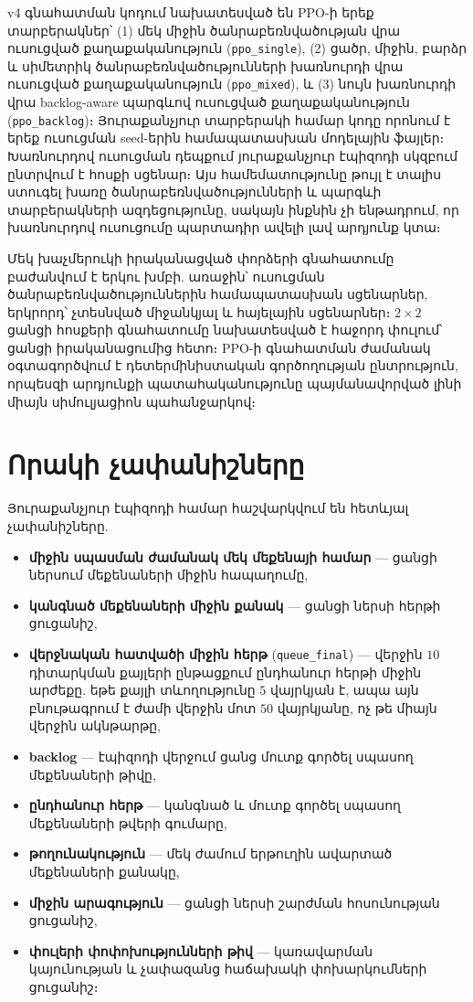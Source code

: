 \documentclass[12pt,a4paper]{extreport}
\begin{document}
v4 գնահատման կոդում նախատեսված են PPO-ի երեք տարբերակներ՝ (1) մեկ միջին ծանրաբեռնվածության վրա ուսուցված քաղաքականություն (\texttt{ppo\_single}), (2) ցածր, միջին, բարձր և սիմետրիկ ծանրաբեռնվածությունների խառնուրդի վրա ուսուցված քաղաքականություն (\texttt{ppo\_mixed}), և (3) նույն խառնուրդի վրա backlog-aware պարգևով ուսուցված քաղաքականություն (\texttt{ppo\_backlog})։ Յուրաքանչյուր տարբերակի համար կոդը որոնում է երեք ուսուցման seed-երին համապատասխան մոդելային ֆայլեր։ Խառնուրդով ուսուցման դեպքում յուրաքանչյուր էպիզոդի սկզբում ընտրվում է հոսքի սցենար։ Այս համեմատությունը թույլ է տալիս ստուգել խառը ծանրաբեռնվածությունների և պարգևի տարբերակների ազդեցությունը, սակայն ինքնին չի ենթադրում, որ խառնուրդով ուսուցումը պարտադիր ավելի լավ արդյունք կտա։

Մեկ խաչմերուկի իրականացված փորձերի գնահատումը բաժանվում է երկու խմբի. առաջին՝ ուսուցման ծանրաբեռնվածություններին համապատասխան սցենարներ, երկրորդ՝ չտեսնված միջանկյալ և հայելային սցենարներ։ $2\times2$ ցանցի հոսքերի գնահատումը նախատեսված է հաջորդ փուլում՝ ցանցի իրականացումից հետո։ PPO-ի գնահատման ժամանակ օգտագործվում է դետերմինիստական գործողության ընտրություն, որպեսզի արդյունքի պատահականությունը պայմանավորված լինի միայն սիմուլյացիոն պահանջարկով։

\section{Որակի չափանիշները}

Յուրաքանչյուր էպիզոդի համար հաշվարկվում են հետևյալ չափանիշները.
\begin{itemize}
  \item \textbf{միջին սպասման ժամանակ մեկ մեքենայի համար} --- ցանցի ներսում մեքենաների միջին հապաղումը,
  \item \textbf{կանգնած մեքենաների միջին քանակ} --- ցանցի ներսի հերթի ցուցանիշ,
  \item \textbf{վերջնական հատվածի միջին հերթ} (\texttt{queue\_final}) --- վերջին $10$ դիտարկման քայլերի ընթացքում ընդհանուր հերթի միջին արժեքը. եթե քայլի տևողությունը $5$ վայրկյան է, ապա այն բնութագրում է ժամի վերջին մոտ $50$ վայրկյանը, ոչ թե միայն վերջին ակնթարթը,
  \item \textbf{backlog} --- էպիզոդի վերջում ցանց մուտք գործել սպասող մեքենաների թիվը,
  \item \textbf{ընդհանուր հերթ} --- կանգնած և մուտք գործել սպասող մեքենաների թվերի գումարը,
  \item \textbf{թողունակություն} --- մեկ ժամում երթուղին ավարտած մեքենաների քանակը,
  \item \textbf{միջին արագություն} --- ցանցի ներսի շարժման հոսունության ցուցանիշ,
  \item \textbf{փուլերի փոփոխությունների թիվ} --- կառավարման կայունության և չափազանց հաճախակի փոխարկումների ցուցանիշ։
\end{itemize}
\end{document}
